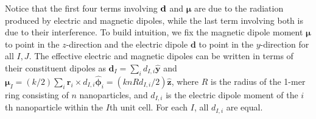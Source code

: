 \documentclass[journal=apchd5,manuscript=article]{achemso}
\begin{document}
Notice that the first four terms involving $\bf d$ and $\boldsymbol\mu$ are due to the radiation produced by electric and magnetic dipoles, while the last term involving both is due to their interference. To build intuition, we fix the magnetic dipole moment $\boldsymbol{\mu}$ to point in the $z$-direction and the electric dipole $\textbf{d}$ to point in the $y$-direction for all $I,J.$ The effective electric and magnetic dipoles can be written in terms of their constituent dipoles as $\textbf{d}_I = \sum_i d_{I,i} \hat{\textbf{y}}$ and $\boldsymbol{\mu}_I = ({k}/{2})\sum_i\textbf{r}_i \times d_{I,i} \hat{\boldsymbol{\phi}}_i = ({knRd_{I,i}}/{2})\hat{\textbf{z}}$, where $R$ is the radius of the 1-mer ring consisting of $n$ nanoparticles, and $d_{I,i}$ is the electric dipole moment of the $i$th nanoparticle within the $I$th unit cell. For each $I$, all $d_{I,i}$ are equal.
\end{document}
